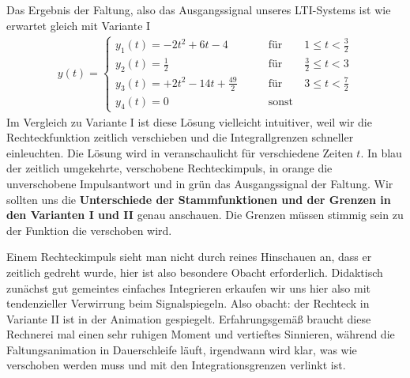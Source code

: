 \begin{Loesung}
Das Ergebnis der Faltung, also das Ausgangssignal unseres LTI-Systems ist
wie erwartet gleich mit Variante I
\begin{align}
y(t) =
\begin{cases}
  y_1(t) = -2 t^2 + 6 t - 4 &\qquad \mathrm{für} \qquad 1 \leq t < \frac{3}{2}\\
  y_2(t) = \frac{1}{2}  &\qquad \mathrm{für} \qquad \frac{3}{2} \leq t < 3\\
  y_3(t) = +2 t^2 - 14 t + \frac{49}{2} &\qquad \mathrm{für} \qquad 3 \leq t < \frac{7}{2}\\
  y_4(t)=0 &\qquad \mathrm{sonst}
\end{cases}
\end{align}
Im Vergleich zu Variante I ist diese Lösung vielleicht
intuitiver, weil wir die Rechteckfunktion zeitlich verschieben und die
Integrallgrenzen schneller einleuchten.
%
Die Lösung wird in  veranschaulicht für verschiedene
Zeiten $t$. In blau der zeitlich umgekehrte, verschobene Rechteckimpuls, in
orange die unverschobene Impulsantwort und in grün das Ausgangssignal der Faltung.
%
Wir sollten uns die \textbf{Unterschiede der Stammfunktionen und der Grenzen in den
Varianten I und II} genau anschauen.
Die Grenzen müssen stimmig sein zu der Funktion die verschoben wird.
%

Einem Rechteckimpuls sieht man nicht durch reines Hinschauen an, dass er
zeitlich gedreht wurde, hier ist also besondere Obacht erforderlich.
%
Didaktisch zunächst gut gemeintes einfaches Integrieren erkaufen wir uns hier also mit tendenzieller Verwirrung beim Signalspiegeln. Also obacht: der Rechteck in Variante II ist in der Animation gespiegelt.
%
Erfahrungsgemäß braucht diese Rechnerei mal einen sehr ruhigen Moment und vertieftes
Sinnieren, während die Faltungsanimation in Dauerschleife läuft, irgendwann
wird klar, was wie verschoben werden muss und mit den Integrationsgrenzen verlinkt
ist.
%
\end{Loesung}















